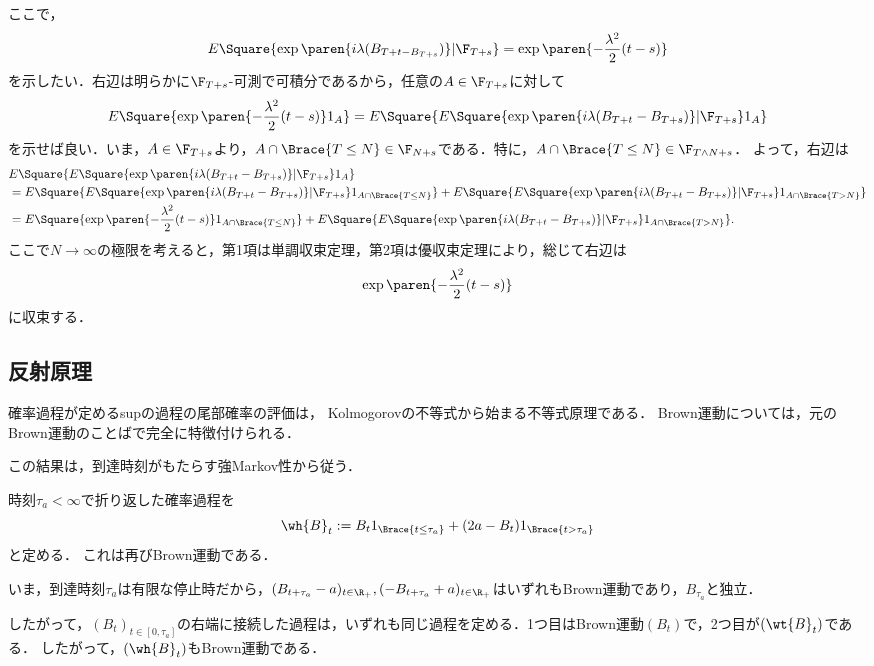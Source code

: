 \documentclass[uplatex,dvipdfmx]{jsreport}
\begin{document}
\begin{Proof}
\begin{description}
        ここで，
        \[E\Square{\exp\paren{i\lambda(B_{T+t-B_{T+s}})}|\F_{T+s}}=\exp\paren{-\frac{\lambda^2}{2}(t-s)}\]
        を示したい．右辺は明らかに$\F_{T+s}$-可測で可積分であるから，任意の$A\in\F_{T+s}$に対して
        \[E\Square{\exp\paren{-\frac{\lambda^2}{2}(t-s)}1_A}=E\Square{E\Square{\exp\paren{i\lambda(B_{T+t}-B_{T+s})}|\F_{T+s}}1_{A}}\]
        を示せば良い．いま，$A\in\F_{T+s}$より，$A\cap\Brace{T\le N}\in\F_{N+s}$である．特に，$A\cap\Brace{T\le N}\in\F_{T\land N+s}$．
        よって，右辺は
        \begin{align*}
            &E\Square{E\Square{\exp\paren{i\lambda(B_{T+t}-B_{T+s})}|\F_{T+s}}1_{A}}\\
            &=E\Square{E\Square{\exp\paren{i\lambda(B_{T+t}-B_{T+s})}|\F_{T+s}}1_{A\cap\Brace{T\le N}}}+E\Square{E\Square{\exp\paren{i\lambda(B_{T+t}-B_{T+s})}|\F_{T+s}}1_{A\cap\Brace{T>N}}}\\
            &=E\Square{\exp\paren{-\frac{\lambda^2}{2}(t-s)}1_{A\cap\Brace{T\le N}}}+E\Square{E\Square{\exp\paren{i\lambda(B_{T+t}-B_{T+s})}|\F_{T+s}}1_{A\cap\Brace{T>N}}}.
        \end{align*}
        ここで$N\to\infty$の極限を考えると，第1項は単調収束定理，第2項は優収束定理により，総じて右辺は
        \[\exp\paren{-\frac{\lambda^2}{2}(t-s)}\]
        に収束する．
    \end{description}
\end{Proof}

\subsection{反射原理}

\begin{tcolorbox}[colframe=ForestGreen, colback=ForestGreen!10!white,breakable,colbacktitle=ForestGreen!40!white,coltitle=black,fonttitle=\bfseries\sffamily,
title=]
    確率過程が定めるsupの過程の尾部確率の評価は，
    Kolmogorovの不等式から始まる不等式原理である．
    Brown運動については，元のBrown運動のことばで完全に特徴付けられる．

    この結果は，到達時刻がもたらす強Markov性から従う．
\end{tcolorbox}

\begin{lemma}[胸像の原理]
    時刻$\tau_a<\infty$で折り返した確率過程を
    \[\wh{B}_t:=B_t1_{\Brace{t\le\tau_a}}+(2a-B_t)1_{\Brace{t>\tau_a}}\]
    と定める．
    これは再びBrown運動である．
\end{lemma}
\begin{Proof}
    いま，到達時刻$\tau_a$は有限な停止時だから，$(B_{t+\tau_a}-a)_{t\in\R_+},(-B_{t+\tau_a}+a)_{t\in\R_+}$はいずれもBrown運動であり，$B_{\tau_a}$と独立．
        
        したがって，$(B_t)_{t\in[0,\tau_a]}$の右端に接続した過程は，いずれも同じ過程を定める．1つ目はBrown運動$(B_t)$で，2つ目が$(\wt{B}_t)$である．
        したがって，$(\wh{B}_t)$もBrown運動である．
\end{Proof}
\end{document}
